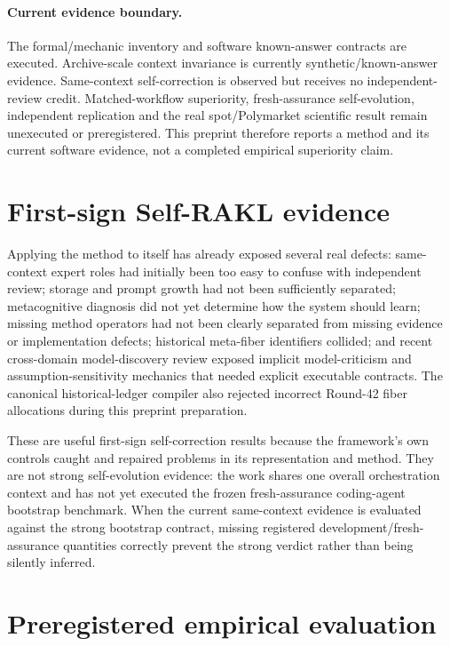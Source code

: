 \documentclass[11pt]{article}
\begin{document}
\paragraph{Current evidence boundary.} The formal/mechanic inventory and software known-answer contracts are executed. Archive-scale context invariance is currently synthetic/known-answer evidence. Same-context self-correction is observed but receives no independent-review credit. Matched-workflow superiority, fresh-assurance self-evolution, independent replication and the real spot/Polymarket scientific result remain unexecuted or preregistered. This preprint therefore reports a method and its current software evidence, not a completed empirical superiority claim.

\section{First-sign Self-RAKL evidence}
Applying the method to itself has already exposed several real defects: same-context expert roles had initially been too easy to confuse with independent review; storage and prompt growth had not been sufficiently separated; metacognitive diagnosis did not yet determine how the system should learn; missing method operators had not been clearly separated from missing evidence or implementation defects; historical meta-fiber identifiers collided; and recent cross-domain model-discovery review exposed implicit model-criticism and assumption-sensitivity mechanics that needed explicit executable contracts. The canonical historical-ledger compiler also rejected incorrect Round-42 fiber allocations during this preprint preparation.

These are useful first-sign self-correction results because the framework's own controls caught and repaired problems in its representation and method. They are not strong self-evolution evidence: the work shares one overall orchestration context and has not yet executed the frozen fresh-assurance coding-agent bootstrap benchmark. When the current same-context evidence is evaluated against the strong bootstrap contract, missing registered development/fresh-assurance quantities correctly prevent the strong verdict rather than being silently inferred.

\section{Preregistered empirical evaluation}
\end{document}
